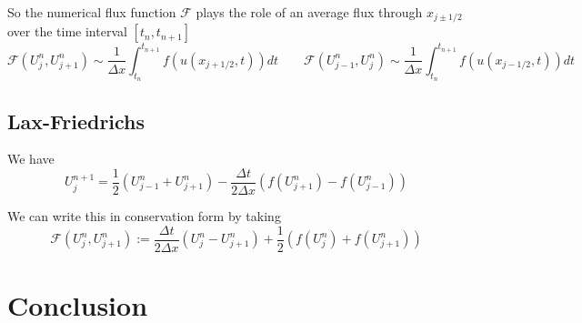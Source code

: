 \documentclass{myproject}
\begin{document}
So the numerical flux function $\mathcal{F}$ plays the role of an average flux through $x_{j\pm1/2}$ over the time interval $[t_n, t_{n+1}]$
\[
    \mathcal{F}(U_j^n, U_{j+1}^n) \sim \frac{1}{\Delta x} \int_{t_n}^{t_{n+1}} f(u(x_{j+1/2}, t)) dt \qquad \mathcal{F}(U_{j-1}^n, U_{j}^n) \sim \frac{1}{\Delta x} \int_{t_n}^{t_{n+1}} f(u(x_{j-1/2}, t)) dt
\]

\subsection{Lax-Friedrichs}

We have
\[
    U_j^{n+1} = \frac{1}{2}\left( U_{j-1}^{n} + U_{j+1}^{n} \right) - \frac{\Delta t}{2\Delta x}\left( f(U_{j+1}^{n}) - f(U_{j-1}^{n}) \right)
\]

We can write this in conservation form by taking
\[
    \mathcal{F}(U_j^n, U_{j+1}^n) := \frac{\Delta t}{2\Delta x}(U_j^n - U_{j+1}^n) + \frac{1}{2}\left( f(U_j^n) + f(U_{j+1}^n) \right)
\]


\section{Conclusion}

\nocite{iserles2009}
\nocite{trefethen2000}
\nocite{leveque1992}
\nocite{leveque2002}
\printbibliography
\end{document}

